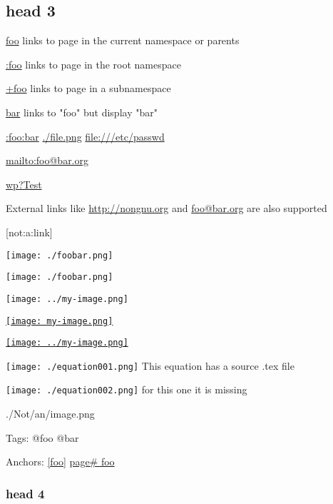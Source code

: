 \subsection{head 3}
\href{foo}{foo}  links to page in the current namespace or parents

\href{:foo}{:foo} links to page in the root namespace

\href{+foo}{+foo} links to page in a subnamespace

\href{foo}{bar} links to "foo" but display "bar"



\href{:foo:bar}{:foo:bar} \href{./file.png}{./file.png} \href{file:///etc/passwd}{file:///etc/passwd}



\href{mailto:foo@bar.org}{mailto:foo@bar.org}

\href{interwiki:wp?Test}{wp?Test}



External links like \href{http://nongnu.org}{http://nongnu.org} and \href{mailto:foo@bar.org}{foo@bar.org} are also supported



[not:a:link]





\texttt{[image: ./foobar.png]}

\texttt{[image: ./foobar.png]}

\texttt{[image: ../my-image.png]}

\href{Foo}{\texttt{[image: my-image.png]}}

\href{:foo:bar}{\texttt{[image: ../my-image.png]}}



\texttt{[image: ./equation001.png]} This equation has a source .tex file

\texttt{[image: ./equation002.png]} for this one it is missing



{./Not/an/image.png}



Tags: @foo @bar



Anchors: \label{foo}  \ref{foo}  \href{page#foo}{page\# foo}





\subsubsection{head 4 \label{head-4-anchor}}


